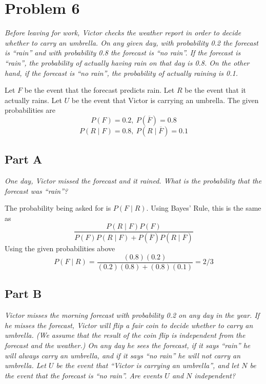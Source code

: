 \documentclass{article}
\begin{document}
\section*{Problem 6}

\textit{Before leaving for work, Victor checks the weather report in order to
decide whether to carry an umbrella. On any given day, with probability 0.2 the
forecast is “rain” and with probability 0.8 the forecast is “no rain”. If the
forecast is “rain”, the probability of actually having rain on that day is 0.8.
On the other hand, if the forecast is “no rain”, the probability of actually
raining is 0.1.}

\bigbreak

Let $ F $ be the event that the forecast predicts rain. Let $ R $ be the event
that it actually rains. Let $ U $ be the event that Victor is carrying an
umbrella. The given probabilities are
$$ P(F) = 0.2,\ P(\overline{F}) = 0.8 $$
$$ P(R \mid F) = 0.8,\ P(R \mid \overline{F}) = 0.1 $$

\subsection*{Part A}

\textit{One day, Victor missed the forecast and it rained. What is the
probability that the forecast was “rain”?}

\bigbreak

The probability being asked for is $ P(F \mid R) $. Using Bayes' Rule, this is
the same as
$$ \frac{P(R \mid F) P(F)}{P(F) P(R \mid F) + P(\overline{F}) P(R \mid
\overline{F}) } $$
Using the given probabilities above
$$ P(F \mid R) = \frac{(0.8) (0.2)}{ (0.2) (0.8) + (0.8) (0.1) } = 2/3 $$

\subsection*{Part B}

\textit{Victor misses the morning forecast with probability 0.2 on any day in
the year. If he misses the forecast, Victor will flip a fair coin to decide
whether to carry an umbrella. (We assume that the result of the coin flip is
independent from the forecast and the weather.) On any day he sees the forecast,
if it says “rain” he will always carry an umbrella, and if it says “no rain” he
will not carry an umbrella. Let $ U $ be the event that “Victor is carrying an
umbrella”, and let $ N $ be the event that the forecast is “no rain”. Are events
$ U $ and $ N $ independent?}
\end{document}
